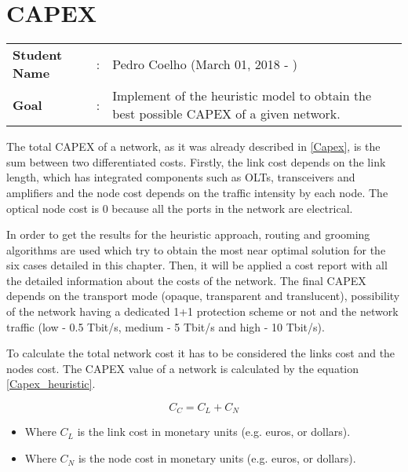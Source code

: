 \clearpage

\section{CAPEX}
\begin{tcolorbox}	
\begin{tabular}{p{2.75cm} p{0.2cm} p{10.5cm}} 	
\textbf{Student Name}  &:& Pedro Coelho    (March 01, 2018 - )\\
\textbf{Goal}          &:& Implement of the heuristic model to obtain the best possible CAPEX of a given network.
\end{tabular}
\end{tcolorbox}
\vspace{11pt}

The total CAPEX of a network, as it was already described in \ref{Capex}, is the sum between two differentiated costs. Firstly, the link cost depends on the link length, which has integrated components such as OLTs, transceivers and amplifiers and the node cost depends on the traffic intensity by each node. The optical node cost is 0 because all the ports in the network are electrical.

In order to get the results for the heuristic approach, routing and grooming algorithms are used which try to obtain the most near optimal solution for the six cases detailed in this chapter. Then, it will be applied a cost report with all the detailed information about the costs of the network. The final CAPEX depends on the transport mode (opaque, transparent and translucent), possibility of the network having a dedicated 1+1 protection scheme or not and the network traffic (low - 0.5 Tbit/s, medium - 5 Tbit/s and high - 10 Tbit/s).

To calculate the total network cost it has to be considered the links cost and the nodes cost. The CAPEX value of a network is calculated by the equation \ref{Capex_heuristic}.

\begin{equation}
C_C = C_L + C_N
\label{Capex_heuristic}
\end{equation}

\begin{itemize}
\item Where {$C_L$ is the link cost in monetary units (e.g. euros, or dollars)}.
\item Where {$C_N$ is the node cost in monetary units (e.g. euros, or dollars)}.
\end{itemize}

